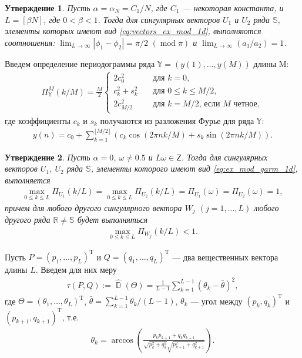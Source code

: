 \documentclass[specialist,
               substylefile = spbu.rtx,
               subf,href,colorlinks=true, 12pt]{disser}
\def\mod{\mathop{\mathrm{mod}}}
\DeclareMathOperator{\D}{\mathbb{D}}
\newtheorem{Th}{Утверждение}
\begin{document}
\begin{Th}  \cite[Утверждение 8]{Zhornikova2016} \label{th:aboutU1U2_ex_mod_1d}
Пусть $\alpha = \alpha_N = C_1/N$, где $C_1$ --- некоторая константа, и $L=[\beta N]$, где $0<\beta<1$. Тогда для сингулярных векторов $U_1$ и $U_2$ ряда $\mathbb{S}$, элементы которых имеют вид \eqref{eq:vectors_ex_mod_1d}, выполняются соотношения: $\lim_{L \rightarrow \infty}{|\phi_1-\phi_2|}=\pi/2 \,\,(\mod \pi)$ и $\lim_{L \rightarrow \infty}{(a_1/a_2)} = 1$.
\end{Th}


Введем определение периодограммы ряда $\mathbb{Y}=(y(1),\ldots,y({M}))$ длины M:
\begin{gather}
\label{eq:per}
 \Pi_{\mathbb{Y}}^M(k/M) = \frac{M}{2}
\begin{cases}
2c_0^2 &\quad \text{для } k = 0, \\
c_k^2 + s_k^2 & \quad \text{для }  0 \leqslant k \leqslant M/2, \\
2c_{M/2}^2 & \quad \text{для } k = M/2   \text{, если } M \text{ четное},
\end{cases}
\end{gather}
где коэффициенты $c_k$ и $s_k$ получаются из разложения Фурье для ряда $\mathbb{Y}$:
\begin{gather*}
y(n) = c_0 + \sum_{k=1}^{\lfloor M/2 \rfloor}\left(c_k\cos(2\pi n k /M) + s_k\sin(2\pi n k/M) \right).
\end{gather*}

\begin{Th}  \cite[Утверждение 3.1]{Alexandrov2006} \label{th:aleks1}
Пусть $\alpha = 0$, $\omega \not = 0.5$ и $L\omega \in \mathsf{Z}$. Тогда для сингулярных векторов $U_1$, $U_2$ ряда $\mathbb{S}$, элементы которого имеют вид \eqref{eq:ex_mod_garm_1d}, выполняется
\begin{gather*}
\max_{0 \leqslant k \leqslant L} \Pi_{U_1}(k/L) = \max_{0 \leqslant k \leqslant L} \Pi_{U_2}(k/L) =  \Pi_{U_1}(\omega) =  \Pi_{U_2}(\omega) = 1,
\end{gather*}
причем для любого другого сингулярного вектора $W_j$ $(j = 1,\ldots, L)$ любого другого ряда $\mathbb{R} \not = \mathbb{S}$ будет выполняться
\begin{gather*}
\max_{0 \leqslant k \leqslant L} \Pi_{W_j}(k/L) < 1.
\end{gather*}
\end{Th}

Пусть $P = (p_1,\ldots,p_L)^{\mathrm{T}}$ и $Q=(q_1,\ldots,q_L)^{\mathrm{T}}$ --- два вещественных вектора длины $L$. Введем для них меру 
\begin{gather} \label{eq:tau1} 
\tau(P, Q) := \hat{\D}(\Theta) =\frac{1}{L-1}\sum_{k=1}^{L-1}{\left(\theta_k  - \bar{\theta}\right)^2},
\end{gather}
где $\Theta=(\theta_1,\ldots,\theta_L)^{\mathrm{T}}$,
$\bar{\theta} = \sum_{k=1}^{L-1}{\theta_k}/(L-1)$, $\theta_k$ --- угол между  
$\left(p_k, q_{k}\right)^{\mathrm{T}}$ и $\left(p_{k+1}, q_{k+1}\right)^{\mathrm{T}}$, т.е.
\begin{gather*}
\theta_k = \arccos{\left(\frac{p_{k} p_{k+1} + q_{k} q_{k+1}}{\sqrt{p_{k}^2+q_{k}^2}\sqrt{p_{k+1}^2+q_{k+1}^2}}\right)}.
\end{gather*}
\end{document}
